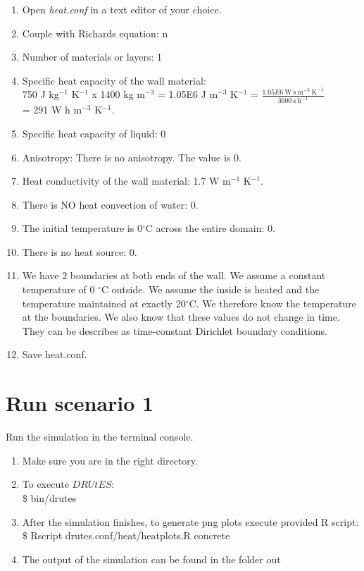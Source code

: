 \documentclass[
10pt, %
a4paper, %
oneside, %
headinclude,footinclude, %
BCOR5mm, %
]{scrartcl}
\begin{document}
\begin{enumerate}
\item Open \emph{heat.conf} in a text editor of your choice. 

\item Couple with Richards equation: n
\item Number of materials or layers: 1 
\item Specific heat capacity of the wall material: \\750 J kg$^{-1}$ K$^{-1}$ x 1400 kg m$^{-3}$ = 1.05E6 J m$^{-3}$ K$^{-1}$ = $\frac{1.05E6~\mathrm{W~s~m^{-3}~K^{-1}}}{3600~\mathrm{s~h^{-1}}}$ \\= 291 W h m$^{-3}$ K$^{-1}$. 
\item Specific heat capacity of liquid: 0
\item Anisotropy: There is no anisotropy. The value is 0.
\item Heat conductivity of the wall material: 1.7 W m$^{-1}$ K$^{-1}$. 
\item There is NO heat convection of water: 0.
\item The initial temperature is 0$^{\circ}$C across the entire domain: 0.
\item There is no heat source: 0. 
\item We have 2 boundaries at both ends of the wall. We assume a constant temperature of 0 $^{\circ}$C outside. We assume the inside is heated and the temperature maintained at exactly 20$^{\circ}$C. We therefore know the temperature at the boundaries. We also know that these values do not change in time. They can be describes as time-constant Dirichlet boundary conditions. \\

\item Save heat.conf.
\end{enumerate}

\section*{Run scenario 1}
Run the simulation in the terminal console.
\begin{enumerate}
\item Make sure you are in the right directory. 
\item To execute $DRUtES$: \\
\$ bin/drutes
\item After the simulation finishes, to generate png plots execute provided R script: \\
\$ Rscript drutes.conf/heat/heatplots.R concrete
\item The output of the simulation can be found in the folder out
\end{enumerate}
\end{document}

